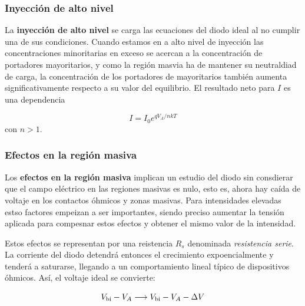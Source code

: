 \subsubsection{Inyección de alto nivel}

La \textbf{inyección de alto nivel} se carga las ecuaciones del diodo ideal al no cumplir una de sus condiciones. Cuando estamos en a alto nivel de inyección las concentraciones minoritarias en exceso se acercan a la concentración de portadores mayoritarios, y como la región masvia ha de mantener su neutraldiad de carga, la concentración de los portadores de mayoritarios también aumenta significativamente respecto a su valor del equilibrio. El resultado neto para $I$ es una dependencia 

\begin{equation}
    I = I_0 e^{qV_A/nkT}
\end{equation}
con $n>1$.

\subsubsection{Efectos en la región masiva}

Los \textbf{efectos en la región masiva} implican un estudio del diodo sin consdierar que el campo eléctrico en las regiones masivas es nulo, esto es, ahora hay caída de voltaje en los contactos óhmicos y zonas masivas. Para intensidades elevadas estso factores empeizan a ser importantes, siendo preciso aumentar la tensión aplicada para compesnar estos efectos y obtener el mismo valor de la intensidad. 

Estos efectos se representan por una reistencia $R_s$ denominada \textit{resistencia serie}. La corriente del diodo detendrá entonces el crecimiento expoencialmente y tenderá a saturarse, llegando a un comportamiento lineal típico de dispositivos óhmicos. Así, el voltaje ideal se convierte:

\begin{equation}
    V_{\text{bi}} - V_A \longrightarrow V_{\text{bi}} - V_A - \Delta V
\end{equation}



